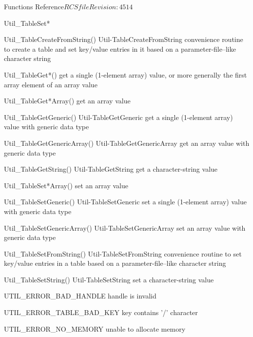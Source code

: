 \begin{cactuspart}{ Functions Reference}{$RCSfile$}{$Revision: 4514 $}
\begin{FunctionDescription}{Util\_TableSet*}
\begin{SeeAlsoSection}
\begin{SeeAlso2} {Util\_TableCreateFromString()} {Util-TableCreateFromString}
convenience routine to create a table and set key/value entries
in it based on a parameter-file--like character string
\end{SeeAlso2}
\begin{SeeAlso}{Util\_TableGet*()}
get a single (1-element array) value,
or more generally the first array element of an array value
\end{SeeAlso}
\begin{SeeAlso}{Util\_TableGet*Array()}
get an array value
\end{SeeAlso}
\begin{SeeAlso2} {Util\_TableGetGeneric()} {Util-TableGetGeneric}
get a single (1-element array) value with generic data type
\end{SeeAlso2}
\begin{SeeAlso2} {Util\_TableGetGenericArray()} {Util-TableGetGenericArray}
get an array value with generic data type
\end{SeeAlso2}
\begin{SeeAlso2} {Util\_TableGetString()} {Util-TableGetString}
get a character-string value
\end{SeeAlso2}
\begin{SeeAlso}{Util\_TableSet*Array()}
set an array value
\end{SeeAlso}
\begin{SeeAlso2} {Util\_TableSetGeneric()} {Util-TableSetGeneric}
set a single (1-element array) value with generic data type
\end{SeeAlso2}
\begin{SeeAlso2} {Util\_TableSetGenericArray()} {Util-TableSetGenericArray}
set an array value with generic data type
\end{SeeAlso2}
\begin{SeeAlso2} {Util\_TableSetFromString()} {Util-TableSetFromString}
convenience routine to set key/value entries in a table based on a
parameter-file--like character string
\end{SeeAlso2}
\begin{SeeAlso2} {Util\_TableSetString()} {Util-TableSetString}
set a character-string value
\end{SeeAlso2}
\end{SeeAlsoSection}

\begin{ErrorSection}
\begin{Error}{UTIL\_ERROR\_BAD\_HANDLE}
handle is invalid
\end{Error}
\begin{Error}{UTIL\_ERROR\_TABLE\_BAD\_KEY}
key contains '/' character
\end{Error}
\begin{Error}{UTIL\_ERROR\_NO\_MEMORY}
unable to allocate memory
\end{Error}
\end{ErrorSection}


\end{FunctionDescription}
\end{cactuspart}
